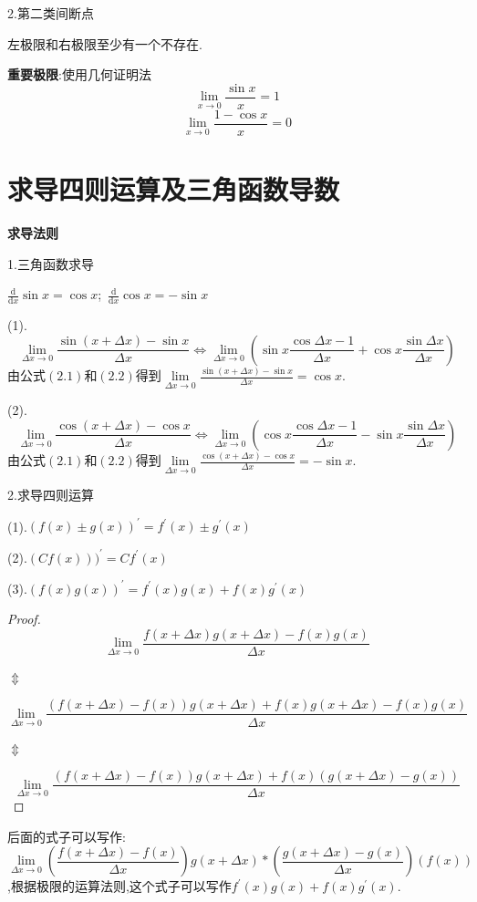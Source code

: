 \documentclass[oneside]{book}
\begin{document}
	2.第二类间断点
	
	左极限和右极限至少有一个不存在.
	
	\textbf{重要极限}:使用几何证明法
	\begin{equation}
		\lim\limits_{x\rightarrow 0}\frac{\sin x}{x}=1
	\end{equation}
	\begin{equation}
		\lim\limits_{x\rightarrow 0}\frac{1-\cos x}{x}=0
	\end{equation}
	
	\chapter{求导四则运算及三角函数导数}
	\textbf{求导法则}
	
	1.三角函数求导
	
	$\frac{\mathrm{d}}{\mathrm{d}x}\sin x=\cos x$;\ $\frac{\mathrm{d}}{\mathrm{d}x}\cos x=-\sin x$
	
	(1).$$\lim\limits_{\Delta x\rightarrow 0}\frac{\sin(x+\Delta x)-\sin x}{\Delta x}\Leftrightarrow \lim\limits_{\Delta x\rightarrow 0}(\sin x\frac{\cos\Delta x-1}{\Delta x}+\cos x\frac{\sin \Delta x}{\Delta x})$$由公式$(2.1)$和$(2.2)$得到$\lim\limits_{\Delta x\rightarrow 0}\frac{\sin(x+\Delta x)-\sin x}{\Delta x}=\cos x$.
	
	(2).$$\lim\limits_{\Delta x\rightarrow 0}\frac{\cos(x+\Delta x)-\cos x}{\Delta x}\Leftrightarrow \lim\limits_{\Delta x\rightarrow 0}(\cos x\frac{\cos\Delta x-1}{\Delta x}-\sin x\frac{\sin \Delta x}{\Delta x})$$由公式$(2.1)$和$(2.2)$得到$\lim\limits_{\Delta x\rightarrow 0}\frac{\cos(x+\Delta x)-\cos x}{\Delta x}=-\sin x$.
	
	2.求导四则运算
	
	(1).$(f(x)\pm g(x))^{'}=f^{'}(x)\pm g^{'}(x)$
	
	(2).$(Cf(x)))^{'}=Cf^{'}(x)$
	
	(3).$(f(x)g(x))^{'}=f^{'}(x)g(x)+f(x)g^{'}(x)$
	\begin{proof}
		\begin{equation}
		\lim\limits_{\Delta x\rightarrow 0}\frac{f(x+\Delta x)g(x+\Delta x)-f(x)g(x)}{\Delta x}
	\end{equation}
	\centerline{$\Updownarrow$}
	\begin{equation}
		\lim\limits_{\Delta x\rightarrow 0}\frac{(f(x+\Delta x)-f(x))g(x+\Delta x)+f(x)g(x+\Delta x)-f(x)g(x)}{\Delta x}
	\end{equation}
	\centerline{$\Updownarrow$}
	\begin{equation}
	 \lim\limits_{\Delta x\rightarrow 0}\frac{(f(x+\Delta x)-f(x))g(x+\Delta x)+f(x)(g(x+\Delta x)-g(x))}{\Delta x}
	\end{equation}
	\end{proof}	
	后面的式子可以写作:$$\lim\limits_{\Delta x\rightarrow 0}(\frac{f(x+\Delta x)-f(x)}{\Delta x})g(x+\Delta x)*(\frac{g(x+\Delta x)-g(x)}{\Delta x})(f(x))$$,根据极限的运算法则,这个式子可以写作$f^{'}(x)g(x)+f(x)g^{'}(x)$.
	
\end{document}
